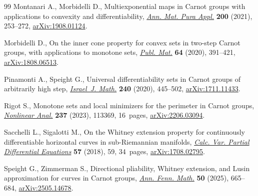 \documentclass[10pt,a4paper]{amsart}
\numberwithin{equation}{section}
\theoremstyle{definition}
\begin{document}
\begin{thebibliography}{99}
Montanari A., Morbidelli D., Multiexponential maps in {C}arnot groups with
 applications to convexity and differentiability,
 \href{https://doi.org/10.1007/s10231-020-00994-3}{\textit{Ann. Mat. Pura
 Appl.}} \textbf{200} (2021), 253--272,
 \href{http://arxiv.org/abs/1908.01124}{arXiv:1908.01124}.

Morbidelli D., On the inner cone property for convex sets in two-step {C}arnot
 groups, with applications to monotone sets,
 \href{https://doi.org/10.5565/PUBLMAT6422002}{\textit{Publ. Mat.}}
 \textbf{64} (2020), 391--421,
 \href{http://arxiv.org/abs/1808.06513}{arXiv:1808.06513}.

Pinamonti A., Speight G., Universal differentiability sets in {C}arnot groups
 of arbitrarily high step,
 \href{https://doi.org/10.1007/s11856-020-2069-x}{\textit{Israel~J. Math.}}
 \textbf{240} (2020), 445--502,
 \href{http://arxiv.org/abs/1711.11433}{arXiv:1711.11433}.

Rigot S., Monotone sets and local minimizers for the perimeter in {C}arnot
 groups, \href{https://doi.org/10.1016/j.na.2023.113369}{\textit{Nonlinear
 Anal.}} \textbf{237} (2023), 113369, 16~pages,
 \href{http://arxiv.org/abs/2206.03094}{arXiv:2206.03094}.

Sacchelli L., Sigalotti M., On the {W}hitney extension property for
 continuously differentiable horizontal curves in sub-{R}iemannian manifolds,
 \href{https://doi.org/10.1007/s00526-018-1336-8}{\textit{Calc. Var. Partial
 Differential Equations}} \textbf{57} (2018), 59, 34~pages,
 \href{http://arxiv.org/abs/1708.02795}{arXiv:1708.02795}.

Speight G., Zimmerman S., Directional pliability, {W}hitney extension, and
 {L}usin approximation for curves in {C}arnot groups,
 \href{https://doi.org/10.54330/afm.176524}{\textit{Ann. Fenn. Math.}}
 \textbf{50} (2025), 665--684,
 \href{http://arxiv.org/abs/2505.14678}{arXiv:2505.14678}.

\end{thebibliography}
\end{document}
